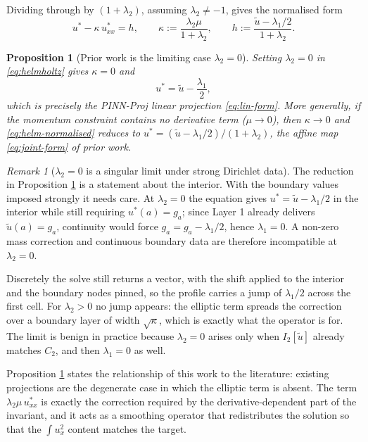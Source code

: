 \documentclass[11pt,a4paper]{article}
\newtheorem{proposition}{Proposition}
\theoremstyle{remark}
\newtheorem{remark}{Remark}
\newcommand{\ut}{\tilde{u}}
\newcommand{\us}{u^{*}}
\begin{document}
Dividing through by $(1+\lambda_2)$, assuming $\lambda_2 \neq -1$, gives the
normalised form
\begin{equation}
\us - \kappa\,\us_{xx} = h,
\qquad
\kappa := \frac{\lambda_2\mu}{1+\lambda_2},
\qquad
h := \frac{\ut - \lambda_1/2}{1+\lambda_2}.
\label{eq:helm-normalised}
\end{equation}

\begin{proposition}[Prior work is the limiting case $\lambda_2=0$]
\label{prop:limit}
Setting $\lambda_2 = 0$ in \eqref{eq:helmholtz} gives $\kappa=0$ and
\begin{equation}
\us = \ut - \frac{\lambda_1}{2},
\end{equation}
which is precisely the PINN-Proj linear projection \eqref{eq:lin-form}. More
generally, if the momentum constraint contains no derivative term
($\mu \to 0$), then $\kappa \to 0$ and \eqref{eq:helm-normalised} reduces to
$\us = (\ut-\lambda_1/2)/(1+\lambda_2)$, the affine map \eqref{eq:joint-form} of
prior work.
\end{proposition}

\begin{remark}[$\lambda_2 = 0$ is a singular limit under strong Dirichlet data]
The reduction in Proposition \ref{prop:limit} is a statement about the interior.
With the boundary values imposed strongly it needs care. At $\lambda_2 = 0$ the
equation gives $\us = \ut - \lambda_1/2$ in the interior while still requiring
$\us(a) = g_a$; since Layer 1 already delivers $\ut(a) = g_a$, continuity would
force $g_a = g_a - \lambda_1/2$, hence $\lambda_1 = 0$. A non-zero mass
correction and continuous boundary data are therefore incompatible at
$\lambda_2 = 0$.

Discretely the solve still returns a vector, with the shift applied to the
interior and the boundary nodes pinned, so the profile carries a jump of
$\lambda_1/2$ across the first cell. For $\lambda_2 > 0$ no jump appears: the
elliptic term spreads the correction over a boundary layer of width
$\sqrt{\kappa}$, which is exactly what the operator is for. The limit is benign
in practice because $\lambda_2 = 0$ arises only when $I_2[\ut]$ already matches
$C_2$, and then $\lambda_1 = 0$ as well.
\end{remark}

\noindent
Proposition \ref{prop:limit} states the relationship of this work to the
literature: existing projections are the degenerate case in which the elliptic
term is absent. The term $\lambda_2\mu\,\us_{xx}$ is exactly the correction
required by the derivative-dependent part of the invariant, and it acts as a
smoothing operator that redistributes the solution so that the $\int u_x^2$
content matches the target.
\end{document}
